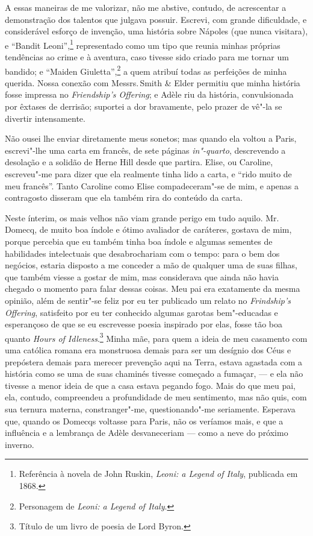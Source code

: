 A essas maneiras de me valorizar, não me abstive, contudo, de
acrescentar a demonstração dos talentos que julgava possuir. Escrevi,
com grande dificuldade, e considerável esforço de invenção, uma história
sobre Nápoles (que nunca visitara), e ``Bandit Leoni'',\footnote{Referência
  à novela de John Ruskin, \textit{Leoni: a Legend of Italy}, publicada em
  1868.} representado como um tipo que reunia minhas
próprias tendências ao crime e à aventura, caso tivesse sido criado para
me tornar um bandido; e ``Maiden Giuletta'',\footnote{Personagem de
  \textit{Leoni: a Legend of Italy}.} a quem atribuí todas
as perfeições de minha querida. Nossa conexão com Messrs.\,Smith \& Elder
permitiu que minha história fosse impressa no \textit{Friendship's
Offering}; e Adèle riu da história, convulsionada por êxtases de
derrisão; suportei a dor bravamente, pelo prazer de vê"-la se divertir
intensamente.

Não ousei lhe enviar diretamente meus sonetos; mas quando ela voltou a
Paris, escrevi"-lhe uma carta em francês, de sete páginas
\textit{in"-quarto}, descrevendo a desolação e a solidão de Herne Hill
desde que partira. Elise, ou Caroline, escreveu"-me para dizer que ela
realmente tinha lido a carta, e ``rido muito de meu francês''. Tanto
Caroline como Elise compadeceram"-se de mim, e apenas a contragosto
disseram que ela também rira do conteúdo da carta.

Neste ínterim, os mais velhos não viam grande perigo em tudo
aquilo. Mr.\,Domecq, de muito boa índole e ótimo avaliador de caráteres,
gostava de mim, porque percebia que eu também tinha boa índole e algumas
sementes de habilidades intelectuais que desabrochariam com o tempo:
para o bem dos negócios, estaria disposto a me conceder a mão de
qualquer uma de suas filhas, que também viesse a gostar de mim, mas
considerava que ainda não havia chegado o momento para falar dessas
coisas. Meu pai era exatamente da mesma opinião, além de sentir"-se feliz
por eu ter publicado um relato no \textit{Frindship's Offering},
satisfeito por eu ter conhecido algumas garotas bem"-educadas e
esperançoso de que se eu escrevesse poesia inspirado por elas, fosse tão
boa quanto \textit{Hours of Idleness}.\footnote{Título de um livro de
  poesia de Lord Byron.} Minha mãe, para quem a
ideia de meu casamento com uma católica romana era monstruosa demais
para ser um desígnio dos Céus e prepóstera demais para merecer prevenção
aqui na Terra, estava agastada com a história como se uma de suas
chaminés tivesse começado a fumaçar, --- e ela não tivesse a menor ideia
de que a casa estava pegando fogo. Mais do que meu pai, ela, contudo,
compreendeu a profundidade de meu sentimento, mas não quis, com sua
ternura materna, constranger"-me, questionando"-me seriamente. Esperava
que, quando os Domecqs voltasse para Paris, não os veríamos mais, e que
a influência e a lembrança de Adèle desvaneceriam --- como a neve do
próximo inverno.

